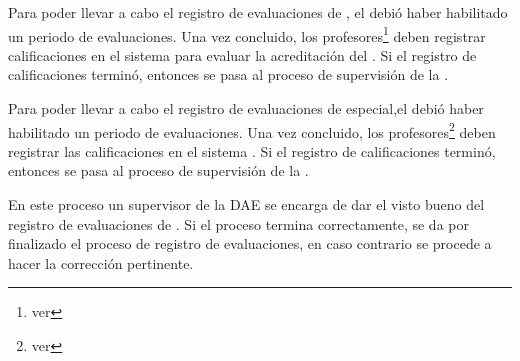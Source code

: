 \begin{PDescripcion}
\begin{enumerate}
		\Ppaso[\PSubProceso] 
		Para poder llevar a cabo el registro de evaluaciones de , el  debió haber habilitado un periodo de evaluaciones. Una vez concluido, los profesores\footnote{ver } deben registrar calificaciones en el sistema  para evaluar la acreditación del .
		Si el registro de calificaciones terminó, entonces se pasa al proceso de supervisión de la .
		
		\Ppaso[\PSubProceso]  Para poder llevar a cabo el registro de evaluaciones de  especial,el  debió haber habilitado un periodo de evaluaciones. Una vez concluido, los profesores\footnote{ver } deben registrar las calificaciones en el sistema .
		Si el registro de calificaciones terminó, entonces se pasa al proceso de supervisión de la .
				
		\Ppaso[\PSubProceso]   En este proceso un supervisor de la DAE se encarga de dar el visto bueno del registro de evaluaciones de . 
		Si el proceso termina correctamente, se da por finalizado el proceso de registro de evaluaciones, en caso contrario se procede a hacer la corrección pertinente.
		

\end{enumerate}
\end{PDescripcion}
